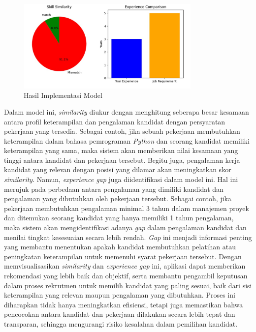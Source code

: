 \documentclass[journal,article,submit,pdftex,moreauthors]{Definitions/mdpi}
\begin{document}
\begin{figure}[H]
    \centering
    \includegraphics[width=0.8\textwidth]{image/implementmodel.jpeg} %
    \captionsetup{justification=centering}
    \caption{Hasil Implementasi Model}
    \label{fig:implementmodel}
\end{figure}

Dalam model ini, \textit{similarity} diukur dengan menghitung seberapa besar kesamaan antara profil keterampilan dan pengalaman kandidat dengan persyaratan pekerjaan yang tersedia. Sebagai contoh, jika sebuah pekerjaan membutuhkan keterampilan dalam bahasa pemrograman \textit{Python} dan seorang kandidat memiliki keterampilan yang sama, maka sistem akan memberikan nilai kesamaan yang tinggi antara kandidat dan pekerjaan tersebut. Begitu juga, pengalaman kerja kandidat yang relevan dengan posisi yang dilamar akan meningkatkan skor \textit{similarity}. Namun, \textit{experience gap} juga diidentifikasi dalam model ini. Hal ini merujuk pada perbedaan antara pengalaman yang dimiliki kandidat dan pengalaman yang dibutuhkan oleh pekerjaan tersebut. Sebagai contoh, jika pekerjaan membutuhkan pengalaman minimal 3 tahun dalam manajemen proyek dan ditemukan seorang kandidat yang hanya memiliki 1 tahun pengalaman, maka sistem akan mengidentifikasi adanya \textit{gap} dalam pengalaman kandidat dan menilai tingkat kesesuaian secara lebih rendah. \textit{Gap} ini menjadi informasi penting yang membantu menentukan apakah kandidat membutuhkan pelatihan atau peningkatan keterampilan untuk memenuhi syarat pekerjaan tersebut. Dengan memvisualisasikan \textit{similarity} dan \textit{experience gap} ini, aplikasi dapat memberikan rekomendasi yang lebih baik dan objektif, serta membantu pengambil keputusan dalam proses rekrutmen untuk memilih kandidat yang paling sesuai, baik dari sisi keterampilan yang relevan maupun pengalaman yang dibutuhkan. Proses ini diharapkan tidak hanya meningkatkan efisiensi, tetapi juga memastikan bahwa pencocokan antara kandidat dan pekerjaan dilakukan secara lebih tepat dan transparan, sehingga mengurangi risiko kesalahan dalam pemilihan kandidat.
\end{document}
